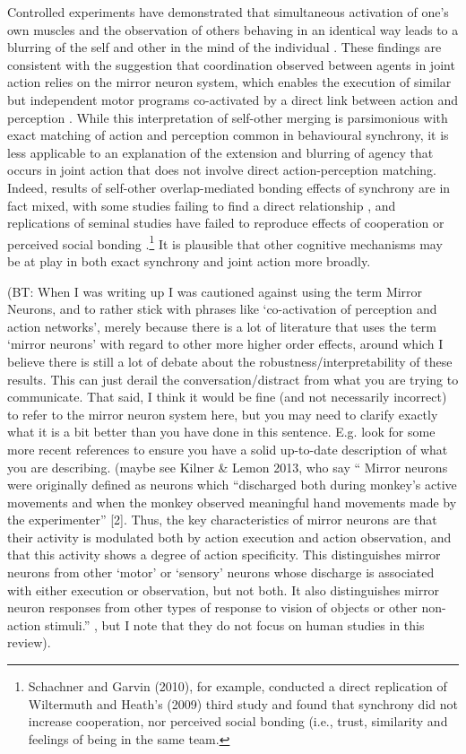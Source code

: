 \begin{CJK}{UTF8}{gbsn}
Controlled experiments have demonstrated that simultaneous activation of one's own muscles and the observation of others behaving in an identical way leads to a blurring of the self and other in the mind of the individual \citep{Hurley2008,Rizzolatti2004}. These findings are consistent with the suggestion that coordination observed between agents in joint action relies on the  mirror neuron system, which enables the execution of similar but independent motor programs co-activated by a direct link between action and perception \citep{Rizzolatti2004}.  While this interpretation of self-other merging is parsimonious with exact matching of action and perception common in behavioural synchrony, it is less applicable to an explanation of the extension and blurring of agency that occurs in joint action that does not involve direct action-perception matching. Indeed, results of self-other overlap-mediated bonding effects of synchrony are in fact mixed, with some studies failing to find a direct relationship \citep{Cohen2013a,Reddish2013a}, and replications of seminal studies have failed to reproduce effects of cooperation or perceived social bonding \citep{Dam2012,Schachner2010}.\footnote{Schachner and Garvin (2010), for example, conducted a direct replication of Wiltermuth and Heath's (2009) third study and found that synchrony did not increase cooperation, nor perceived social bonding (i.e., trust, similarity and feelings of being in the same team.} It is plausible that other cognitive mechanisms may be at play in both exact synchrony and joint action more broadly.

(BT: When I was writing up I was cautioned against using the term Mirror Neurons, and to rather stick with phrases like ‘co-activation of perception and action networks’, merely because there is a lot of literature that uses the term ‘mirror neurons’ with regard to other more higher order effects, around which I believe there is still a lot of debate about the robustness/interpretability of these results. This can just derail the conversation/distract from what you are trying to communicate. That said, I think it would be fine (and not necessarily incorrect) to refer to the mirror neuron system here, but you may need to clarify exactly what it is a bit better than you have done in this sentence. E.g. look for some more recent references to ensure you have a solid up-to-date description of what you are describing. (maybe see Kilner & Lemon 2013, who say “ Mirror neurons were originally defined as neurons which “discharged both during monkey’s active movements and when the monkey observed meaningful hand movements made by the experimenter” [2]. Thus, the key characteristics of mirror neurons are that their activity is modulated both by action execution and action observation, and that this activity shows a degree of action specificity. This distinguishes mirror neurons from other ‘motor’ or ‘sensory’ neurons whose discharge is associated with either execution or observation, but not both. It also distinguishes mirror neuron responses from other types of response to vision of objects or other non-action stimuli.” , but I note that they do not focus on human studies in this review).


\end{CJK}
